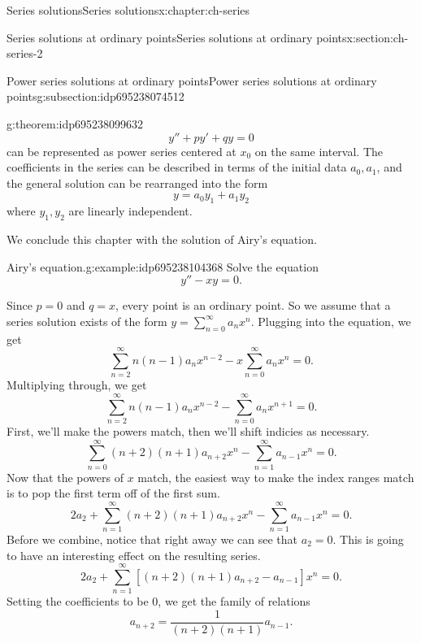 \documentclass[oneside,10pt,]{book}
\numberwithin{equation}{section}
\numberwithin{equation}{section}
\newcommand{\ps}{\displaystyle \sum_{n=0}^\infty a_n x^n}
\begin{document}
\begin{chapterptx}{Series solutions}{}{Series solutions}{}{}{x:chapter:ch-series}
\begin{sectionptx}{Series solutions at ordinary points}{}{Series solutions at ordinary points}{}{}{x:section:ch-series-2}
\begin{subsectionptx}{Power series solutions at ordinary points}{}{Power series solutions at ordinary points}{}{}{g:subsection:idp695238074512}
\begin{theorem}{}{}{g:theorem:idp695238099632}
\begin{equation*}
y'' + p y' + q y = 0
\end{equation*}
can be represented as power series centered at \(x_0\) on the same interval. The coefficients in the series can be described in terms of the initial data \(a_0, a_1\), and the general solution can be rearranged into the form%
\begin{equation*}
y = a_0 y_1 + a_1 y_2
\end{equation*}
where \(y_1, y_2\) are linearly independent.%
\end{theorem}
We conclude this chapter with the solution of Airy's equation.%
\begin{example}{Airy's equation.}{g:example:idp695238104368}%
Solve the equation%
\begin{equation*}
y'' - x y = 0.
\end{equation*}
%
\par
Since \(p = 0\) and \(q = x\), every point is an ordinary point. So we assume that a series solution exists of the form \(y = \ps\). Plugging into the equation, we get%
\begin{equation*}
\sum_{n=2}^\infty n(n-1) a_n x^{n-2} - x \ps = 0.
\end{equation*}
Multiplying through, we get%
\begin{equation*}
\sum_{n=2}^\infty n(n-1) a_n x^{n-2} - \sum_{n = 0}^\infty a_n x^{n+1} = 0.
\end{equation*}
First, we'll make the powers match, then we'll shift indicies as necessary.%
\begin{equation*}
\sum_{n=0}^\infty (n+2)(n+1) a_{n+2} x^{n} - \sum_{n = 1}^\infty a_{n-1} x^{n} = 0.
\end{equation*}
Now that the powers of \(x\) match, the easiest way to make the index ranges match is to pop the first term off of the first sum.%
\begin{equation*}
2a_2 + \sum_{n=1}^\infty (n+2)(n+1) a_{n+2} x^{n} - \sum_{n = 1}^\infty a_{n-1} x^{n} = 0.
\end{equation*}
Before we combine, notice that right away we can see that \(a_2 = 0\). This is going to have an interesting effect on the resulting series.%
\begin{equation*}
2a_2 + \sum_{n=1}^\infty \left[(n+2)(n+1) a_{n+2} - a_{n-1} \right] x^n = 0.
\end{equation*}
Setting the coefficients to be 0, we get the family of relations%
\begin{equation*}
a_{n+2} = \frac{1}{(n+2)(n+1)} a_{n-1}.

\end{equation*}
\end{example}
\end{subsectionptx}
\end{sectionptx}
\end{chapterptx}
\end{document}
